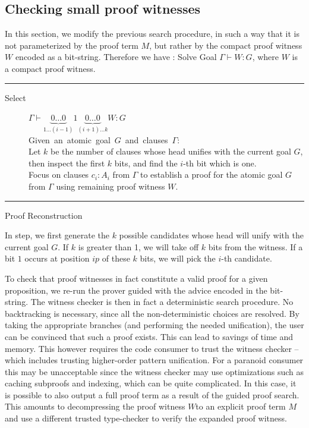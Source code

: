 \documentclass{acmconf}
\newcommand{\figfoot}{\vspace{1ex}\hrule}
\newcommand{\fighead}{\hrule\vspace{1.5ex}}
\newcommand{\vd}{\vdash}
\begin{document}
\subsection{Checking small proof witnesses}
In this section, we modify the previous search procedure, in such a
way that it is not parameterized by the proof term $M$, but rather by
the compact proof witness $W$ encoded as a bit-string. Therefore we
have : Solve Goal $\Gamma \vd W : G$, where $W$ is a compact proof witness.  

\begin{table}[h]
\fighead
\begin{center}
\begin{small}
\begin{description}
\item[Select] $\Gamma \vd \underset{1 \ldots
    (i-1)}{\underbrace{0\ldots 0}}1\underset{(i+1) \ldots
    k}{\underbrace{0\ldots 0}}W : G $ \\
    \mbox{Given an atomic goal $G$ and clauses $\Gamma$:}\hfill\\
    Let $k$ be the number of clauses whose head unifies with the
    current goal $G$, then inspect the first $k$ bits, and
    find the $i$-th bit which is one.\\  
    Focus on clauses $c_i : A_i$ from $\Gamma$ to establish a proof
    for the atomic goal $G$ from $\Gamma$ using remaining proof witness $W$.
\end{description}
\end{small}    
\end{center}
\figfoot
\caption{\label{fig:pwgen} Proof Reconstruction}
\end{table}

In {} step, we first generate the $k$ possible candidates whose
head will unify with the current goal $G$. If $k$ is greater than 1, we
will take off $k$ bits from the witness. If a bit $1$ occurs at
position $ip$ of these $k$ bits, we will pick the $i$-th candidate.

To check that proof witnesses in fact constitute a valid proof for a
given proposition, we re-run the prover guided with the advice encoded
in the bit-string. The witness checker is then in fact a deterministic
search procedure. No backtracking is necessary, since all the
non-deterministic choices are resolved.  By taking the appropriate
branches (and performing the needed unification), the user can be convinced that such a
proof exists. This can lead to savings of time and memory.
This however requires the code consumer to trust the witness
checker -- which includes trusting higher-order pattern
unification. For a paranoid consumer this may be unacceptable since
the witness checker may use optimizations such as caching subproofs
and indexing, which can be quite complicated. In this case, it is
possible to also output a full proof term as a result of the guided
proof search. This amounts to decompressing the proof witness $W$to an
explicit proof term $M$ and use a different trusted type-checker to
verify the expanded proof witness. 
\end{document}
